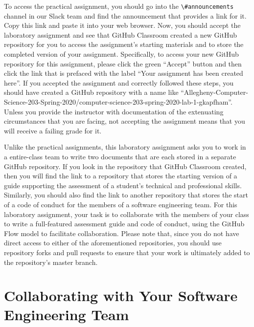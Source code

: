 \documentclass[11pt]{article}
\newcommand{\channel}[1]{\lstinline{#1}}
\begin{document}
To access the practical assignment, you should go into the
\channel{\#announcements} channel in our Slack team and find the announcement
that provides a link for it. Copy this link and paste it into your web browser.
Now, you should accept the laboratory assignment and see that GitHub Classroom
created a new GitHub repository for you to access the assignment's starting
materials and to store the completed version of your assignment. Specifically,
to access your new GitHub repository for this assignment, please click the green
``Accept'' button and then click the link that is prefaced with the label ``Your
assignment has been created here''. If you accepted the assignment and correctly
followed these steps, you should have created a GitHub repository with a name
like
``Allegheny-Computer-Science-203-Spring-2020/computer-science-203-spring-2020-lab-1-gkapfham''.
Unless you provide the instructor with documentation of the extenuating
circumstances that you are facing, not accepting the assignment means that you
will receive a failing grade for it.


Unlike the practical assignments, this laboratory assignment asks you to work in
a entire-class team to write two documents that are each stored in a separate
GitHub repository. If you look in the repository that GitHub Classroom created,
then you will find the link to a repository that stores the starting version of
a guide supporting the assessment of a student's technical and professional
skills. Similarly, you should also find the link to another repository that
stores the start of a code of conduct for the members of a software engineering
team. For this laboratory assignment, your task is to collaborate with the
members of your class to write a full-featured assessment guide and code of
conduct, using the GitHub Flow model to facilitate collaboration. Please note
that, since you do not have direct access to either of the aforementioned
repositories, you should use repository forks and pull requests to ensure that
your work is ultimately added to the repository's master branch.

\section*{Collaborating with Your Software Engineering Team}
\end{document}

